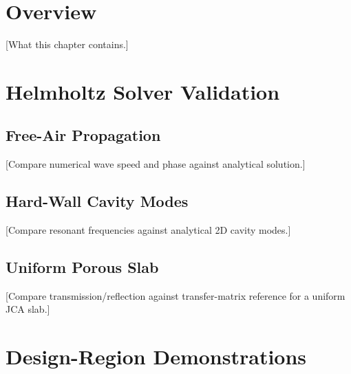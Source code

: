 
\section{Overview}
\label{sec:res_overview}


[What this chapter contains.]

\section{Helmholtz Solver Validation}
\label{sec:validation}


\subsection{Free-Air Propagation}
[Compare numerical wave speed and phase against analytical solution.]

\subsection{Hard-Wall Cavity Modes}
[Compare resonant frequencies against analytical 2D cavity modes.]

\subsection{Uniform Porous Slab}
[Compare transmission/reflection against transfer-matrix reference for a uniform JCA slab.]

\section{Design-Region Demonstrations}
\label{sec:demonstrations}


